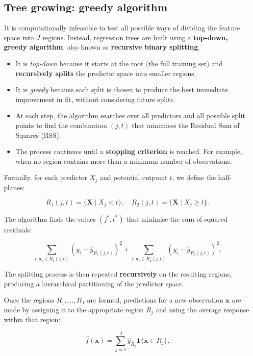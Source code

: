 \documentclass[
  letterpaper,
  DIV=11,
  numbers=noendperiod]{scrartcl}
\providecommand{\tightlist}{%
  \setlength{\itemsep}{0pt}\setlength{\parskip}{0pt}}\usepackage{longtable,booktabs,array}
\begin{document}
\subsection{Tree growing: greedy
algorithm}\label{tree-growing-greedy-algorithm}

It is computationally infeasible to test all possible ways of dividing
the feature space into \(J\) regions. Instead, regression trees are
built using a \textbf{top-down, greedy algorithm}, also known as
\textbf{recursive binary splitting}.

\begin{itemize}
\tightlist
\item
  It is \emph{top-down} because it starts at the root (the full training
  set) and \textbf{recursively splits} the predictor space into smaller
  regions.
\item
  It is \emph{greedy} because each split is chosen to produce the best
  immediate improvement in fit, without considering future splits.
\item
  At each step, the algorithm searches over all predictors and all
  possible split points to find the combination \((j, t)\) that
  minimises the Residual Sum of Squares (RSS).
\item
  The process continues until a \textbf{stopping criterion} is reached.
  For example, when no region contains more than a minimum number of
  observations.
\end{itemize}

Formally, for each predictor \(X_j\) and potential cutpoint \(t\), we
define the half-planes:

\[R_1(j, t) = \{ \mathbf{X} \mid X_j < t \}, \quad R_2(j, t) = \{ \mathbf{X} \mid X_j \ge t \}.\]

The algorithm finds the values \((j^*, t^*)\) that minimise the sum of
squared residuals:

\[\sum_{i : \mathbf{x}_i \in R_1(j, t)} (y_i - \hat{y}_{R_1(j, t)})^2 + \sum_{i : \mathbf{x}_i \in R_2(j, t)} (y_i - \hat{y}_{R_2(j, t)})^2.\]

The splitting process is then repeated \textbf{recursively} on the
resulting regions, producing a hierarchical partitioning of the
predictor space.

Once the regions \(R_1, \ldots, R_J\) are formed, predictions for a new
observation \(\mathbf{x}\) are made by assigning it to the appropriate
region \(R_j\) and using the average response within that region:

\[\hat{f}(\mathbf{x}) = \sum_{j=1}^{J} \hat{y}_{R_j} \mathbf{1}\{ \mathbf{x} \in R_j \}.\]
\end{document}
